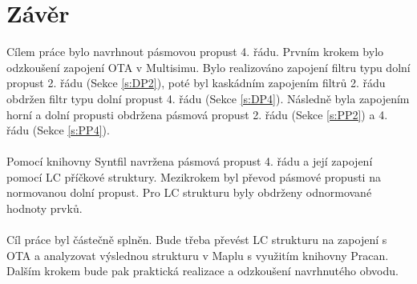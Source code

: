 \documentclass[twoside]{article}
\begin{document}
\section{Závěr}
\noindent Cílem práce bylo navrhnout pásmovou propust 4. řádu. Prvním krokem bylo odzkoušení zapojení OTA v Multisimu. Bylo realizováno zapojení filtru typu dolní propust 2. řádu (Sekce \ref{s:DP2}), poté byl kaskádním zapojením filtrů 2. řádu obdržen filtr typu dolní propust 4. řádu (Sekce \ref{s:DP4}). Následně byla zapojením horní a dolní propusti obdržena pásmová propust 2. řádu (Sekce \ref{s:PP2}) a 4. řádu (Sekce \ref{s:PP4}).\\
\\
Pomocí knihovny Syntfil navržena pásmová propust 4. řádu a její zapojení pomocí LC příčkové struktury. Mezikrokem byl převod pásmové propusti na normovanou dolní propust. Pro LC strukturu byly obdrženy odnormované hodnoty prvků. \\
\\
Cíl práce byl částečně splněn. Bude třeba převést LC strukturu na zapojení s OTA a analyzovat výslednou strukturu v Maplu s využitím knihovny Pracan. Dalším krokem bude pak praktická realizace a odzkoušení navrhnutého obvodu.
\end{document}
